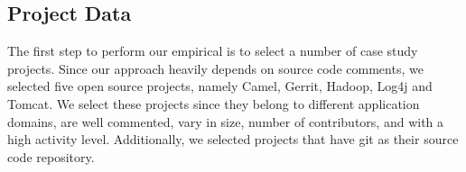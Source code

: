 



\subsection{Project Data}
\label{sub:project_data_extraction}
The first step to perform our empirical is to select a number of case study projects. Since our approach heavily depends on source code comments, we selected five open source projects, namely Camel, Gerrit, Hadoop, Log4j and Tomcat. We select these projects since they belong to different application domains, are well commented, vary in size, number of contributors, and with a high activity level. Additionally, we selected projects that have git as their source code repository.






